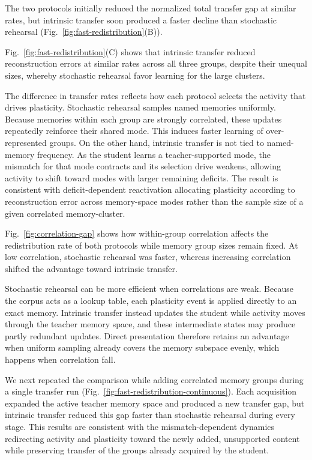 \documentclass[10pt,letterpaper]{article}
\theoremstyle{plain}
\theoremstyle{remark}
\begin{document}
The two protocols initially reduced the normalized total transfer gap at similar rates, but intrinsic transfer soon produced a faster decline than stochastic rehearsal (Fig.~\ref{fig:fast-redistribution}(B)).

Fig.~\ref{fig:fast-redistribution}(C) shows that intrinsic transfer reduced reconstruction errors at similar rates across all three groups, despite their unequal sizes, whereby stochastic rehearsal favor learning for the large clusters.

The difference in transfer rates reflects how each protocol selects the activity that drives plasticity. Stochastic rehearsal samples named memories uniformly. Because memories within each group are strongly correlated, these updates repeatedly reinforce their shared mode. This induces faster learning of over-represented groups. On the other hand, intrinsic transfer is not tied to named-memory frequency. As the student learns a teacher-supported mode, the mismatch for that mode contracts and its selection drive weakens, allowing activity to shift toward modes with larger remaining deficits. The result is consistent with deficit-dependent reactivation allocating plasticity according to reconstruction error across memory-space modes rather than the sample size of a given correlated memory-cluster.

Fig.~\ref{fig:correlation-gap} shows how within-group correlation affects the redistribution rate of both protocols while memory group sizes remain fixed. At low correlation, stochastic rehearsal was faster, whereas increasing correlation shifted the advantage toward intrinsic transfer.

Stochastic rehearsal can be more efficient when correlations are weak. Because the corpus acts as a lookup table, each plasticity event is applied directly to an exact memory. Intrinsic transfer instead updates the student while activity moves through the teacher memory space, and these intermediate states may produce partly redundant updates. Direct presentation therefore retains an advantage when uniform sampling already covers the memory subspace evenly, which happens when correlation fall.

We next repeated the comparison while adding correlated memory groups during a single transfer run (Fig.~\ref{fig:fast-redistribution-continuous}). Each acquisition expanded the active teacher memory space and produced a new transfer gap, but intrinsic transfer reduced this gap faster than stochastic rehearsal during every stage. This results are consistent with the mismatch-dependent dynamics redirecting activity and plasticity toward the newly added, unsupported content while preserving transfer of the groups already acquired by the student. 
\end{document}
